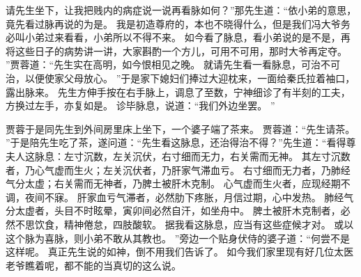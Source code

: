请先生坐下，让我把贱内的病症说一说再看脉如何？”那先生道：“依小弟的意思，竟先看过脉再说的为是。
我是初造尊府的，本也不晓得什么，但是我们冯大爷务必叫小弟过来看看，小弟所以不得不来。
如今看了脉息，看小弟说的是不是，再将这些日子的病势讲一讲，大家斟酌一个方儿，可用不可用，那时大爷再定夺。
”贾蓉道：“先生实在高明，如今恨相见之晚。
就请先生看一看脉息，可治不可治，以便使家父母放心。
”于是家下媳妇们捧过大迎枕来，一面给秦氏拉着袖口，露出脉来。
先生方伸手按在右手脉上，调息了至数，宁神细诊了有半刻的工夫，方换过左手，亦复如是。
诊毕脉息，说道：“我们外边坐罢。
”\par
贾蓉于是同先生到外间房里床上坐下，一个婆子端了茶来。
贾蓉道：“先生请茶。
”于是陪先生吃了茶，遂问道：“先生看这脉息，还治得治不得？”先生道：“看得尊夫人这脉息：左寸沉数，左关沉伏，右寸细而无力，右关需而无神。
其左寸沉数者，乃心气虚而生火；左关沉伏者，乃肝家气滞血亏。
右寸细而无力者，乃肺经气分太虚；右关需而无神者，乃脾土被肝木克制。
心气虚而生火者，应现经期不调，夜间不寐。
肝家血亏气滞者，必然肋下疼胀，月信过期，心中发热。
肺经气分太虚者，头目不时眩晕，寅卯间必然自汗，如坐舟中。
脾土被肝木克制者，必然不思饮食，精神倦怠，四肢酸软。
据我看这脉息，应当有这些症候才对。
或以这个脉为喜脉，则小弟不敢从其教也。
”旁边一个贴身伏侍的婆子道：“何尝不是这样呢。
真正先生说的如神，倒不用我们告诉了。
如今我们家里现有好几位太医老爷瞧着呢，都不能的当真切的这么说。
